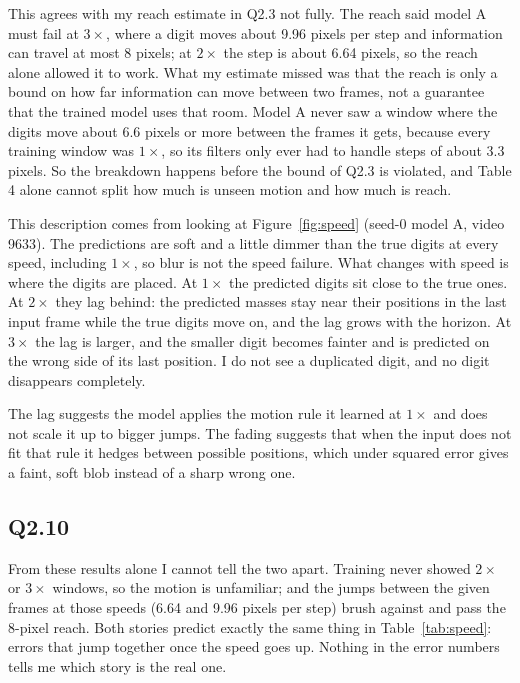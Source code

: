 \documentclass[11pt,letterpaper]{article}
\begin{document}
This agrees with my reach estimate in Q2.3 not fully. The reach said model A must fail at
$3\times$, where a digit moves about 9.96 pixels per step and information can travel at most 8
pixels; at $2\times$ the step is about 6.64 pixels, so the reach alone allowed it to work. What my
estimate missed was that the reach is only a bound on how far information can move between two frames, not
a guarantee that the trained model uses that room. Model A never saw a window where the digits
move about 6.6 pixels or more between the frames it gets, because every training window was
$1\times$, so its filters only ever had to handle steps of about 3.3 pixels. So the breakdown
happens before the bound of Q2.3 is violated, and Table 4 alone cannot split how much is unseen
motion and how much is reach.

This description comes from looking at Figure~\ref{fig:speed} (seed-0 model A, video 9633). The predictions are soft and a little dimmer than the true digits at every speed,
including $1\times$, so blur is not the speed failure. What changes with speed is where the digits
are placed. At $1\times$ the predicted digits sit close to the true ones. At $2\times$ they lag
behind: the predicted masses stay near their positions in the last input frame while the true digits
move on, and the lag grows with the horizon. At $3\times$ the lag is larger, and the smaller digit
becomes fainter and is predicted on the wrong side of its last position. I do not see a duplicated
digit, and no digit disappears completely.

The lag suggests the model applies the motion rule it learned at $1\times$ and does not scale it up
to bigger jumps. The fading suggests that when the input does not fit that rule it hedges between
possible positions, which under squared error gives a faint, soft blob instead of a sharp wrong one.

\subsection*{Q2.10}

From these results alone I cannot tell the two apart. Training never showed $2\times$ or
$3\times$ windows, so the motion is unfamiliar; and the jumps between the given frames at those
speeds (6.64 and 9.96 pixels per step) brush against and pass the 8-pixel reach. Both stories
predict exactly the same thing in Table~\ref{tab:speed}: errors that jump together once the speed
goes up. Nothing in the error numbers tells me which story is the real one.
\end{document}

